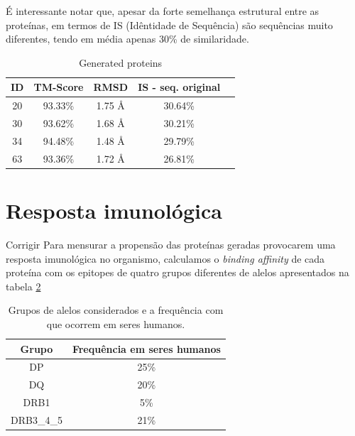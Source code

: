 É interessante notar que, apesar da forte semelhança estrutural entre as proteínas,
em termos de IS (Idêntidade de Sequência)
são sequências muito diferentes, tendo em média apenas 30\% de similaridade. 
  
\begin{table}[htbp]
    \centering
    \begin{tabular}{c|cccc}
        \hline
        \textbf{ID} & \textbf{TM-Score} & \textbf{RMSD} & \textbf{IS - seq. original} \\
        \hline
         20 & 93.33\% & 1.75 Å & 30.64\% \\
         30 & 93.62\% & 1.68 Å & 30.21\% \\
         34 & 94.48\% & 1.48 Å & 29.79\% \\
         63 & 93.36\% & 1.72 Å & 26.81\% \\
        \hline
    \end{tabular}
    \caption{Generated proteins}
    \label{tab:tabela_exemplo}
\end{table}



\section{Resposta imunológica}

{\color{red} Corrigir}
Para mensurar a propensão das proteínas geradas provocarem uma resposta imunológica no organismo, 
calculamos o \textit{binding affinity} de cada proteína com os epitopes de quatro grupos diferentes 
de alelos apresentados na tabela \ref{tab:alelo_grupos}


    \begin{table}[]
        \begin{tabular}{|c|c|}
        \hline
        \rowcolor[HTML]{C0C0C0} 
        {\color[HTML]{343434} Grupo} & {\color[HTML]{343434} Frequência em seres humanos} \\ \hline
        DP                                                                         & 25\%                                                                           \\ \hline
        DQ                                                                         & 20\%                                                                           \\ \hline
        DRB1                                                                       & 5\%                                                                            \\ \hline
        DRB3\_4\_5                                                                 & 21\%                                                                           \\ \hline
        \end{tabular}
        \caption{Grupos de alelos considerados e a frequência com que ocorrem em seres humanos.}
        \label{tab:alelo_grupos}
        \end{table}


